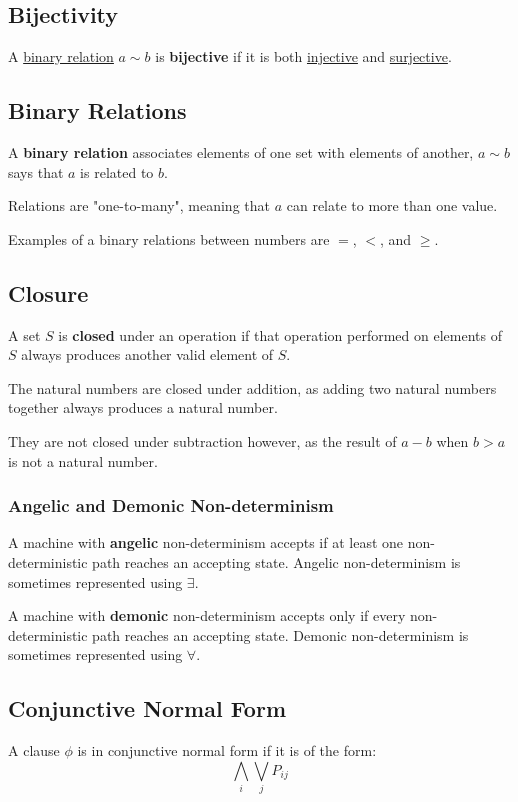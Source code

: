 \documentclass{article}
\begin{document}
\subsection{Bijectivity}\label{bijection}
A \hyperref[binary-relation]{binary relation} $a \sim b$ is \textbf{bijective} if it is both \hyperref[injective]{injective} and \hyperref[surjective]{surjective}.


\subsection{Binary Relations}\label{binary-relation}
A \textbf{binary relation} associates elements of one set with elements of another, $a \sim b$ says that $a$ is related to $b$.

Relations are "one-to-many", meaning that $a$ can relate to more than one value.

Examples of a binary relations between numbers are $=$, $<$, and $\geq$.


\subsection{Closure}\label{closure}
A set $S$ is \textbf{closed} under an operation if that operation performed on elements of $S$ always produces another valid element of $S$.

The natural numbers are closed under addition, as adding two natural numbers together always produces a natural number.

They are not closed under subtraction however, as the result of $a - b$ when $b > a$ is not a natural number.


\subsubsection{Angelic and Demonic Non-determinism}\label{angel-devil}
A machine with \textbf{angelic} non-determinism accepts if at least one non-deterministic path reaches an accepting state. Angelic non-determinism is sometimes represented using $\exists$.

A machine with \textbf{demonic} non-determinism accepts only if every non-deterministic path reaches an accepting state. Demonic non-determinism is sometimes represented using $\forall$.


\subsection{Conjunctive Normal Form}\label{cnf}
A clause $\phi$ is in conjunctive normal form if it is of the form:
\[\bigwedge_i \bigvee_j P_{ij}\]
\end{document}
